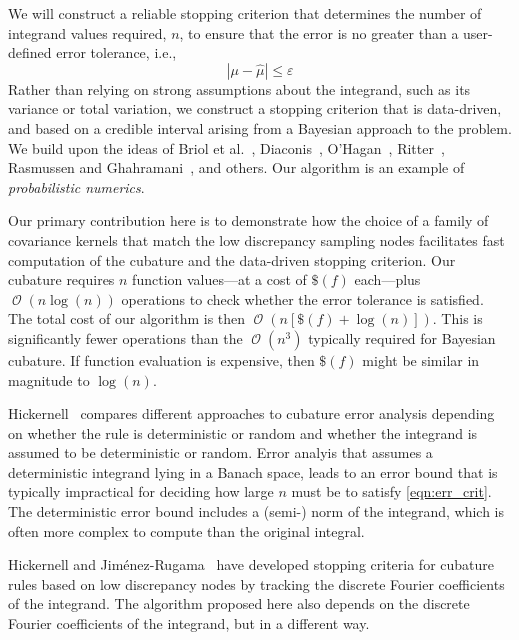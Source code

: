 \documentclass[twocolumn]{svjour3}          %
\DeclareMathOperator{\Order}{{\mathcal O}}
\newcommand{\hmu}{\widehat{\mu}}
\newcommand{\errtol}{\varepsilon}
\def\abs#1{\ensuremath{\left \lvert #1 \right \rvert}}
\begin{document}
We will construct a reliable stopping criterion that determines the number of integrand values required, $n$, to ensure that the error is no greater than a user-defined error tolerance, i.e., 
\begin{equation}
\label{eqn:err_crit} 
\abs{\mu - \hmu} \leq \errtol 
\end{equation}
Rather than relying on strong assumptions about the integrand, such as its variance or total variation, we construct a stopping criterion that is data-driven, and based on a credible interval arising from a Bayesian approach to the problem.  We build upon the ideas of Briol et al.~\cite{BriEtal18a}, Diaconis~\cite{DiaconisBayesian}, O'Hagan~\cite{HagenBayes}, Ritter~\cite{RiterAverage}, Rasmussen and Ghahramani~\cite{RasmussenBayesian}, and others.  Our algorithm is an example of \emph{probabilistic numerics}.

Our primary contribution here is to demonstrate how the choice of a family of covariance kernels that match the low discrepancy sampling nodes facilitates fast computation of the cubature and the data-driven stopping criterion.  Our cubature requires $n$ function values---at a cost of $\$(f)$ each---plus $\Order(n \log(n))$ operations to check whether the error tolerance is satisfied.  The total cost of our algorithm is then $\Order(n [\$(f) + \log(n)])$.  This is significantly fewer operations than the $\Order(n^3)$ typically required for Bayesian cubature.  If function evaluation is expensive, then $\$(f)$ might be similar in magnitude to $\log(n)$.

Hickernell~\cite{Hic17a} compares different approaches to cubature error analysis depending on whether the rule is deterministic or random and whether the integrand is assumed to be deterministic or random.  Error analyis that assumes a deterministic integrand lying in a Banach space, leads to an error bound that is typically impractical for deciding how large $n$ must be to satisfy \eqref{eqn:err_crit}.  The deterministic error bound includes a (semi-) norm of the integrand, which is often more complex to compute than the original integral.

Hickernell and Jim\'enez-Rugama~\cite{HicJim16a,JimHic16a} have developed stopping criteria for cubature rules based on low discrepancy nodes by tracking the discrete Fourier coefficients of the integrand.  The algorithm proposed here also depends on the discrete Fourier coefficients of the integrand, but in a different way.
\end{document}
